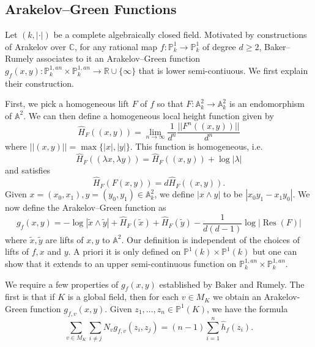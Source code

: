 \documentclass[10pt]{amsart}
\newcommand{\bb}{\mathbb}
\newcommand{\Res}{\operatorname{Res}}
\newcommand{\berkP}{\mathbb{P}^{1,an}}
\newcommand{\h}{\widehat{h}}
\newcommand{\Ht}{\widehat{H}}
\numberwithin{theorem}{section}
\numberwithin{example}{section}
\numberwithin{definition}{section}
\begin{document}
\subsection{Arakelov--Green Functions} Let $(k, | \cdot|)$ be a complete algebraically closed field. Motivated by constructions of Arakelov over $\bb{C}$, for any rational map $f: \bb{P}^1_k \to \bb{P}^1_k$ of degree $d \geq 2$, Baker--Rumely \cite{BR06} associates to it an Arakelov--Green function $g_f(x,y): \berkP_k \times \berkP_k \to \bb{R} \cup \{\infty\}$ that is lower semi-contiuous. We first explain their construction. 
\par 
First, we pick a homogeneous lift $F$ of $f$ so that $F: \bb{A}^2_k \to \bb{A}^2_k$ is an endomorphism of $\bb{A}^2$. We can then define a homogeneous local height function given by
$$\Ht_F((x,y)) = \lim_{n \to \infty} \frac{1}{d^n} \frac{||F^n((x,y))||}{d^n}$$
where $||(x,y)|| = \max\{|x|,|y|\}$. This function is homogeneous, i.e. 
$$\Ht_F((\lambda x , \lambda y)) = \Ht_F((x,y)) + \log |\lambda|$$
and satisfies
$$\Ht_F(F(x,y)) = d \Ht_F((x,y)).$$
Given $x = (x_0,x_1), y = (y_0,y_1) \in \bb{A}^2_k$, we define $|x \wedge y|$ to be $|x_0 y_1 - x_1y_0|$. We now define the Arakelov--Green function as
$$g_f(x,y) = -\log |\tilde{x} \wedge \tilde{y}| + \Ht_F(\tilde{x}) + \Ht_F(\tilde{y}) - \frac{1}{d(d-1)} \log |\Res(F)|$$
where $\tilde{x}, \tilde{y}$ are lifts of $x,y$ to $\bb{A}^2$. Our definition is independent of the choices of lifts of $f,x$ and $y$. A priori it is only defined on $\bb{P}^1(k) \times \bb{P}^1(k)$ but one can show that it extends to an upper semi-continuous function on $\berkP_k \times \berkP_k$. 
\par 
We require a few properties of $g_f(x,y)$ established by Baker and Rumely. The first is that if $K$ is a global field, then for each $v \in M_K$ we obtain an Arakelov-Green function $g_{f,v}(x,y)$. Given $z_1,\ldots,z_n \in \bb{P}^1(K)$, we have the formula 
\begin{equation} \label{eq: GlobalArakelovSum1}
\sum_{v \in M_K} \sum_{i\not = j} N_v g_{f,v}(z_i,z_j) = (n-1) \sum_{i=1}^{n} \h_f(z_i).
\end{equation}
\end{document}
